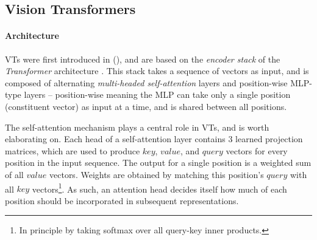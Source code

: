 

\subsection{Vision Transformers} \label{vits}
\paragraph{Architecture}
VTs were first introduced in \citeauthor{dosovitskiy2020image} (\citeyear{dosovitskiy2020image}), and are based on the \textit{encoder stack} of the \textit{Transformer} architecture \citep{vaswani2017attention}. This stack takes a sequence of vectors as input, and is composed of alternating \textit{multi-headed self-attention} layers and position-wise MLP-type layers -- position-wise meaning the MLP can take only a single position (constituent vector) as input at a time, and is shared between all positions.

The self-attention mechanism plays a central role in VTs, and is worth elaborating on. Each head of a self-attention layer contains 3 learned projection matrices, which are used to produce $key$, $value$, and $query$ vectors for every position in the input sequence. The output for a single position is a weighted sum of all $value$ vectors. Weights are obtained by matching this position's $query$ with all $key$ vectors\footnote{In principle by taking softmax over all query-key inner products.}. As such, an attention head decides itself how much of each position should be incorporated in subsequent representations.

